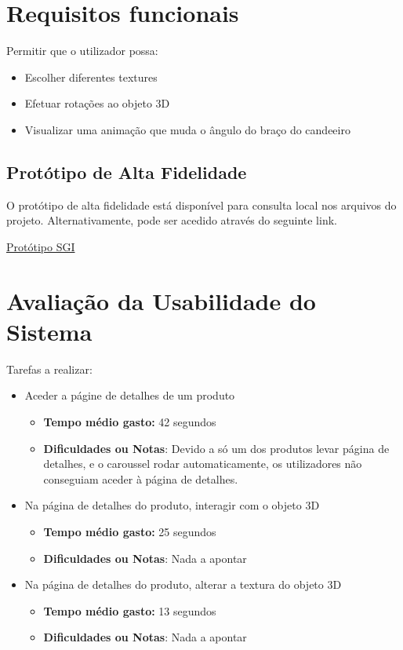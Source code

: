 \documentclass[a4paper,12pt]{article}
\begin{document}
\newpage
\section{Requisitos funcionais}
Permitir que o utilizador possa:
\begin{itemize}
    \item Escolher diferentes textures
    \item Efetuar rotações ao objeto 3D
    \item Visualizar uma animação que muda o ângulo do braço do candeeiro
\end{itemize}

\subsection*{Protótipo de Alta Fidelidade}
O protótipo de alta fidelidade está disponível para consulta local nos arquivos do projeto.
Alternativamente, pode ser acedido através do seguinte link.
\begin{center}
    \textcolor{linkblue}{\href{https://www.figma.com/community/file/1456708074172973839}{Protótipo SGI}}
\end{center}

\newpage
\section{Avaliação da Usabilidade do Sistema}

Tarefas a realizar:
\begin{itemize}
    \item Aceder a págine de detalhes de um produto
          \begin{itemize}
              \item \textbf{Tempo médio gasto:} 42 segundos
              \item \textbf{Dificuldades ou Notas}: Devido a só um dos produtos levar página de detalhes, e o caroussel rodar automaticamente, os utilizadores não conseguiam aceder à página de detalhes.
          \end{itemize}
    \item Na página de detalhes do produto, interagir com o objeto 3D
          \begin{itemize}
              \item \textbf{Tempo médio gasto:} 25 segundos
              \item \textbf{Dificuldades ou Notas}: Nada a apontar
          \end{itemize}
    \item Na página de detalhes do produto, alterar a textura do objeto 3D
          \begin{itemize}
              \item \textbf{Tempo médio gasto:} 13 segundos
              \item \textbf{Dificuldades ou Notas}: Nada a apontar
          \end{itemize}
\end{itemize}
\end{document}
